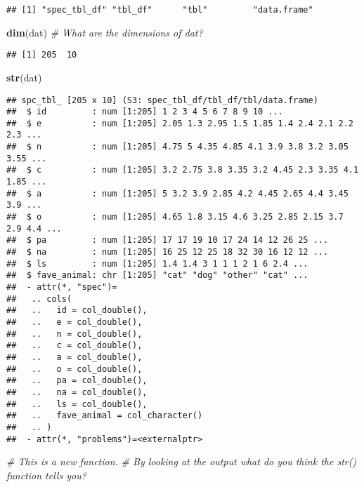 \documentclass[
]{article}
\newenvironment{Shaded}{\begin{snugshade}}{\end{snugshade}}
\newcommand{\CommentTok}[1]{\textcolor[rgb]{0.56,0.35,0.01}{\textit{#1}}}
\newcommand{\FunctionTok}[1]{\textcolor[rgb]{0.13,0.29,0.53}{\textbf{#1}}}
\newcommand{\NormalTok}[1]{#1}
\begin{document}
\begin{verbatim}
## [1] "spec_tbl_df" "tbl_df"      "tbl"         "data.frame"
\end{verbatim}

\begin{Shaded}
\begin{Highlighting}[]
\FunctionTok{dim}\NormalTok{(dat) }\CommentTok{\# What are the dimensions of dat? }
\end{Highlighting}
\end{Shaded}

\begin{verbatim}
## [1] 205  10
\end{verbatim}

\begin{Shaded}
\begin{Highlighting}[]
\FunctionTok{str}\NormalTok{(dat) }
\end{Highlighting}
\end{Shaded}

\begin{verbatim}
## spc_tbl_ [205 x 10] (S3: spec_tbl_df/tbl_df/tbl/data.frame)
##  $ id         : num [1:205] 1 2 3 4 5 6 7 8 9 10 ...
##  $ e          : num [1:205] 2.05 1.3 2.95 1.5 1.85 1.4 2.4 2.1 2.2 2.3 ...
##  $ n          : num [1:205] 4.75 5 4.35 4.85 4.1 3.9 3.8 3.2 3.05 3.55 ...
##  $ c          : num [1:205] 3.2 2.75 3.8 3.35 3.2 4.45 2.3 3.35 4.1 1.85 ...
##  $ a          : num [1:205] 5 3.2 3.9 2.85 4.2 4.45 2.65 4.4 3.45 3.9 ...
##  $ o          : num [1:205] 4.65 1.8 3.15 4.6 3.25 2.85 2.15 3.7 2.9 4.4 ...
##  $ pa         : num [1:205] 17 17 19 10 17 24 14 12 26 25 ...
##  $ na         : num [1:205] 16 25 12 25 18 32 30 16 12 12 ...
##  $ ls         : num [1:205] 1.4 1.4 3 1 1 1 2 1 6 2.4 ...
##  $ fave_animal: chr [1:205] "cat" "dog" "other" "cat" ...
##  - attr(*, "spec")=
##   .. cols(
##   ..   id = col_double(),
##   ..   e = col_double(),
##   ..   n = col_double(),
##   ..   c = col_double(),
##   ..   a = col_double(),
##   ..   o = col_double(),
##   ..   pa = col_double(),
##   ..   na = col_double(),
##   ..   ls = col_double(),
##   ..   fave_animal = col_character()
##   .. )
##  - attr(*, "problems")=<externalptr>
\end{verbatim}

\begin{Shaded}
\begin{Highlighting}[]
\CommentTok{\# This is a new function.}
\CommentTok{\# By looking at the output what do you think the str() function tells you? }
\end{Highlighting}
\end{Shaded}
\end{document}

